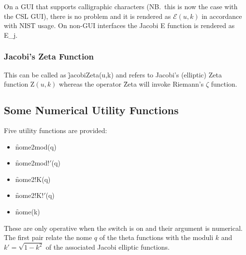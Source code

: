 On a GUI that supports calligraphic characters (NB.\ this is now the case with the
CSL GUI), there is no problem and it is rendered as $\mathcal{E}(u,k)$
in accordance with NIST usage.
On non-GUI interfaces the Jacobi E function is rendered as E\_j.

%
%

\subsubsection{Jacobi's Zeta Function}
\hypertarget{operator:JACOBIZETA}{}

This can be called as \f{jacobiZeta(u,k)} and refers to Jacobi's (elliptic)
Zeta function $\mathrm{Z}(u,k)$ whereas the operator \f{Zeta} will invoke
Riemann's $\zeta$ function.


\subsection{Some Numerical Utility Functions}
\hypertarget{operator:NOME}{}
\hypertarget{operator:NOME2K}{}
\hypertarget{operator:NOME2K'}{}
\hypertarget{operator:NOME2MOD}{}
\hypertarget{operator:NOME2MOD'}{}
\hypertarget{ELLIPNOME}{}

Five utility functions are provided:
\begin{itemize}
\item \f{nome2mod(q)}
\item \f{nome2mod!$'$(q)}
\item \f{nome2!K(q)}
\item \f{nome2!K!$'$(q)}
\item \f{nome(k)}
\end{itemize}

These are only operative when the switch  is on and their
argument is numerical. The first pair relate the nome $q$ of the theta
functions with the moduli $k$ and $k'=\sqrt{1-k^2}$ of the associated Jacobi
elliptic functions.

